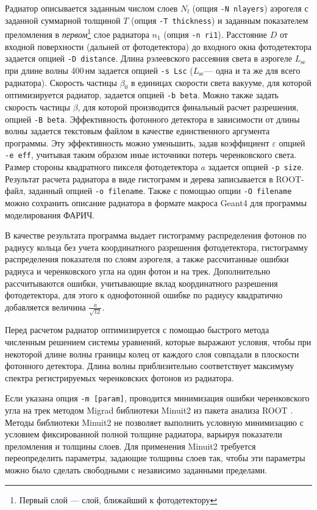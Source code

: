 \documentclass[12pt]{article}
\newcommand{\lsc}{$L_\mathrm{sc}$\xspace}
\newcommand{\betaop}{$\beta_\mathrm{0}$\xspace}
\begin{document}
Радиатор описывается заданным числом слоев $N_l$ (опция {\tt -N nlayers}) аэрогеля с заданной суммарной толщиной $T$ (опция {\tt -T thickness}) и 
заданным показателем преломления в {\em первом}\footnote{Первый слой --- слой, ближайший к фотодетектору} слое радиатора $n_1$ (опция {\tt -n ri1}). 
Расстояние $D$ от входной поверхности (дальней от фотодетектора) до входного окна фотодетектора задается опцией {\tt -D distance}.
Длина рэлеевского рассеяния света в аэрогеле \lsc при длине волны 400\,нм задается опцией {\tt -s Lsc} (\lsc --- одна и та же для всего радиатора). 
Скорость частицы \betaop в единицах скорости света вакууме, для которой оптимизируется радиатор, задается опцией {\tt -b beta}. 
Можно также задать скорость частицы $\beta$, для которой производится финальный расчет разрешения, опцией {\tt -B beta}.
Эффективность фотонного детектора в зависимости от длины волны задается текстовым файлом в качестве единственного аргумента программы. 
Эту эффективность можно уменьшить, задав коэффициент $\varepsilon$ опцией {\tt -e eff}, учитывая таким образом иные источники потерь черенковского света. 
Размер стороны квадратного пикселя фотодетектора $a$ задается опцией {\tt -p size}. Результат расчета радиатора в виде гистограмм и дерева записывается 
в ROOT-файл, заданный опцией {\tt -o filename}. Также с помощью опции {\tt -O filename} можно сохранить описание радиатора в формате макроса Geant4 
для программы моделирования ФАРИЧ.

В качестве результата программа выдает гистограмму распределения фотонов по радиусу кольца без учета координатного разрешения фотодетектора, гистограмму
распределения показателя по слоям аэрогеля, а также рассчитанные ошибки радиуса и черенковского угла на один фотон и на трек. 
Дополнительно рассчитываются ошибки, учитывающие вклад координатного разрешения 
фотодетектора, для этого к однофотонной ошибке по радиусу квадратично добавляется величина $\frac{a}{\sqrt{12}}$.

Перед расчетом радиатор оптимизируется с помощью быстрого метода численным решением системы уравнений, которые
выражают условия, чтобы при некоторой длине волны границы колец от каждого слоя 
совпадали в плоскости фотонного детектора. Длина волны приблизительно соответствует
максимуму спектра регистрируемых черенковских фотонов из радиатора. 

Если указана опция {\tt -m [param]}, проводится минимизация ошибки черенковского угла на трек методом Migrad библиотеки Minuit2 из пакета анализа ROOT \cite{minuit2}. 
Методы библиотеки Minuit2 не позволяет выполнить условную минимизацию с условием фиксированной полной толщине радиатора, варьируя показатели преломления и толщины слоев. 
Для применения Minuit2 требуется переопределить параметры, задающие толщины слоев так, чтобы эти параметры можно было сделать свободными с независимо заданными пределами.
\end{document}
